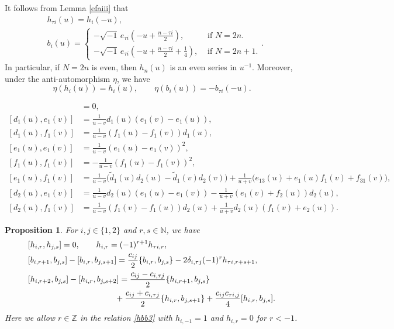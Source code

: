 \documentclass[10pt,a4paper]{amsart}
\newtheorem{prop}{Proposition}
\newcommand{\bN}{\mathbb{N}}
\newcommand{\bZ}{\mathbb{Z}}
\newcommand{\beq}{\begin{equation}}
\newcommand{\eeq}{\end{equation}}
\newcommand{\tl}{\tilde}
\begin{document}
It follows from Lemma \ref{efaiii} that
\begin{align}
\label{i=tauih}
&h_{\tau i}(u)=h_{i}(-u),\\  
&b_{i}(u)=\begin{cases}
-\sqrt{-1}\,e_{\tau i}(-u+\tfrac{n- \tau i}{2}),&\text{ if }N=2n.\\
-\sqrt{-1}\,e_{\tau i}(-u+\tfrac{n- \tau i}{2}+\frac{1}{4}), &\text{ if }N=2n+1.
\end{cases}.\label{fi=tauie}
\end{align}
In particular, if $N=2n$ is even, then $h_n(u)$ is an even series in $u^{-1}$. Moreover, under the anti-automorphism $\eta$, we have
\beq\label{etahb}
\eta (h_i(u))=h_i(u),\qquad \eta(b_{i}(u))=-b_{\tau i}(-u).
\eeq

\begin{align}
[d_i(u),d_j(v)]&=0,\label{ddb3}\\
[d_1(u),e_1(v)]&=\frac{1}{u-v}d_1(u)(e_1(v)-e_1(u)),\label{d1e1b3}\\
[d_1(u),f_1(v)]&=\frac{1}{u-v}(f_1(u)-f_1(v))d_1(u),\label{d1f1b3}\\
[e_1(u),e_1(v)]&=\frac{1}{u-v}(e_1(u)-e_1(v))^2,\label{e1e1b3}\\
[f_1(u),f_1(v)]&=-\frac{1}{u-v}(f_1(u)-f_1(v))^2,\label{f1f1b3}\\
[e_1(u),f_1(v)]&=\frac{1}{u-v}\big(\tl d_1(u)d_2(u)-\tl d_1(v)d_2(v)\big)+\frac{1}{u+v}\big(e_{13}(u)+e_1(u)f_1(v)+f_{31}(v)\big),\label{e1f1b3}\\
[d_2(u),e_1(v)]&=\frac{1}{u-v}d_2(u)(e_1(u)-e_1(v))-\frac{1}{u+v}(e_1(v)+f_2(u))d_2(u),\label{d2e1b3}\\
[d_2(u),f_1(v)]&=\frac{1}{u-v}(f_1(v)-f_1(u))d_2(u)+\frac{1}{u+v}d_2(u)(f_1(v)+e_2(u)).\label{d2f1b3}
\end{align}

\begin{prop}\label{X=3prop}
For $i,j\in\{1,2\}$ and $r,s\in\bN$, we have 
\begin{align}
&[h_{i,r},h_{j,s}]=0,\qquad h_{i,r}=(-1)^{r+1}h_{\tau i,r},\label{hhb3}\\
&[b_{i,r+1},b_{j,s}]  - [b_{i,r },b_{j,s+1 }]  =\frac{c_{ij}}{2}\{b_{i,r },b_{j,s}\}-2\delta_{i,\tau j} (-1)^{r}h_{\tau i,r+s+1 },\label{bbb3}\\
&[h_{i,r+2},b_{j,s}] - [h_{i,r},b_{j,s+2}]=\frac{c_{ij}-c_{i,\tau j}}{2}\{h_{i,r+1},b_{j,s}\}\notag\\
&\qquad\qquad\qquad \qquad \qquad \ \  +\frac{c_{ij}+c_{i,\tau j}}{2} \{h_{i,r},b_{j,s+1}\}+\frac{c_{ij}c_{\tau i,j}}{4} [h_{i,r}, b_{j,s}].\label{hbb3}
\end{align}
Here we allow $r\in\bZ$ in the relation \eqref{hbb3} with $h_{i,-1}=1$ and $h_{i,r}=0$ for $r<-1$.
\end{prop}
\end{document}
